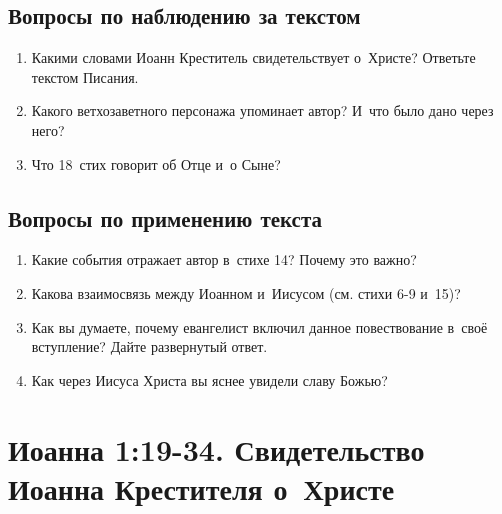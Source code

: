 \documentclass[a4paper,12pt]{article}
\begin{document}
\subsection*{Вопросы по наблюдению за текстом}
\begin{enumerate}
    \item Какими словами Иоанн Креститель свидетельствует о~Христе? Ответьте текстом Писания. 
    
    \myline
    
    \myline

    \item Какого ветхозаветного персонажа упоминает автор? И~что было дано через него? 
    
    \myline
    
    \myline
    \item Что 18~стих говорит об Отце и~о Сыне?
    
    \myline
    
    \myline
\end{enumerate}

\subsection*{Вопросы по применению текста} 
\begin{enumerate}
    \item Какие события отражает автор в~стихе 14? Почему это важно?
    
    \myline
    
    \myline
    \item Какова взаимосвязь между Иоанном и~Иисусом (см. стихи 6-9 и~15)? 
    
    \myline
    
    \myline
    \item Как вы думаете, почему евангелист включил данное повествование в~своё вступление? Дайте развернутый ответ. 
    
    \myline
    
    \myline
    \item Как через Иисуса Христа вы яснее увидели славу Божью?
    
    \myline
    
    \myline
\end{enumerate}



\section{Иоанна 1:19-34. Свидетельство Иоанна Крестителя о~Христе}
\end{document}
